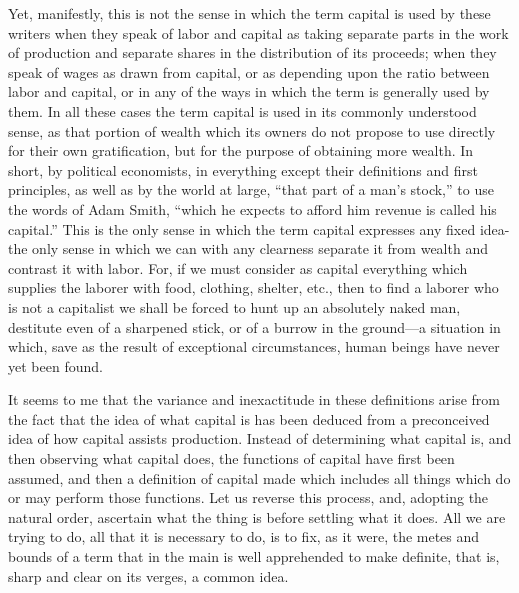 Yet, manifestly, this is not the sense in which the term capital is used
by these writers when they speak of labor and capital as taking separate
parts in the work of production and separate shares in the distribution
of its proceeds; when they speak of wages as drawn from capital, or as
depending upon the ratio between labor and capital, or in any of the
ways in which the term is generally used by them. In all these cases the
term capital is used in its commonly understood sense, as that portion
of wealth which its owners do not propose to use directly for their own
gratification, but for the purpose of obtaining more wealth. In short,
by political economists, in everything except their definitions and
first principles, as well as by the world at large, ``that part of a
man's stock,'' to use the words of Adam Smith, ``which he expects to
afford him revenue is called his capital.'' This is the only sense in
which the term capital expresses any fixed idea-the only sense in which
we can with any clearness separate it from wealth and contrast it with
labor. For, if we must consider as capital everything which supplies the
laborer with food, clothing, shelter, etc., then to find a laborer who
is not a capitalist we shall be forced to hunt up an absolutely naked
man, destitute even of a sharpened stick, or of a burrow in the
ground---a situation in which, save as the result of exceptional
circumstances, human beings have never yet been found.

It seems to me that the variance and inexactitude in these definitions
arise from the fact that the idea of what capital is has been deduced
from a preconceived idea of how capital assists production. Instead of
determining what capital is, and then observing what capital does, the
functions of capital have first been assumed, and then a definition of
capital made which includes all things which do or may perform those
functions. Let us reverse this process, and, adopting the natural order,
ascertain what the thing is before settling what it does. All we are
trying to do, all that it is necessary to do, is to fix, as it were, the
metes and bounds of a term that in the main is well apprehended to make
definite, that is, sharp and clear on its verges, a common idea.

